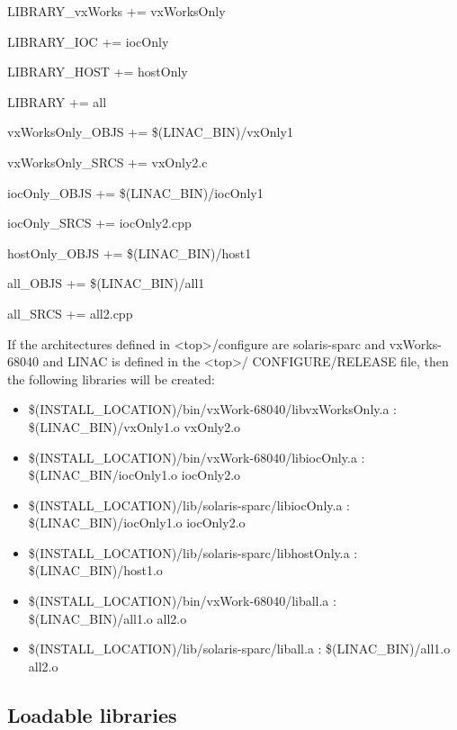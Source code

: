 \begin{description}\item LIBRARY\_vxWorks += vxWorksOnly

\item LIBRARY\_IOC += iocOnly

\item LIBRARY\_HOST += hostOnly

\item LIBRARY += all

\item 

\item vxWorksOnly\_OBJS += \$(LINAC\_BIN)/vxOnly1

\item vxWorksOnly\_SRCS += vxOnly2.c

\item iocOnly\_OBJS += \$(LINAC\_BIN)/iocOnly1

\item iocOnly\_SRCS += iocOnly2.cpp

\item hostOnly\_OBJS +=  \$(LINAC\_BIN)/host1

\item all\_OBJS += \$(LINAC\_BIN)/all1

\item all\_SRCS += all2.cpp

\end{description}If the architectures defined in \textless{}top\textgreater{}/configure are solaris-sparc and vxWorks-68040 and LINAC is defined in the \textless{}top\textgreater{}/
CONFIGURE/RELEASE file, then the following libraries will be created:

\begin{itemize}\item \$(INSTALL\_LOCATION)/bin/vxWork-68040/libvxWorksOnly.a : \$(LINAC\_BIN)/vxOnly1.o vxOnly2.o

\item \$(INSTALL\_LOCATION)/bin/vxWork-68040/libiocOnly.a : \$(LINAC\_BIN/iocOnly1.o iocOnly2.o

\item \$(INSTALL\_LOCATION)/lib/solaris-sparc/libiocOnly.a : \$(LINAC\_BIN)/iocOnly1.o iocOnly2.o

\item \$(INSTALL\_LOCATION)/lib/solaris-sparc/libhostOnly.a : \$(LINAC\_BIN)/host1.o

\item \$(INSTALL\_LOCATION)/bin/vxWork-68040/liball.a : \$(LINAC\_BIN)/all1.o all2.o

\item \$(INSTALL\_LOCATION)/lib/solaris-sparc/liball.a : \$(LINAC\_BIN)/all1.o all2.o

\end{itemize}\subsection{ Loadable libraries}

